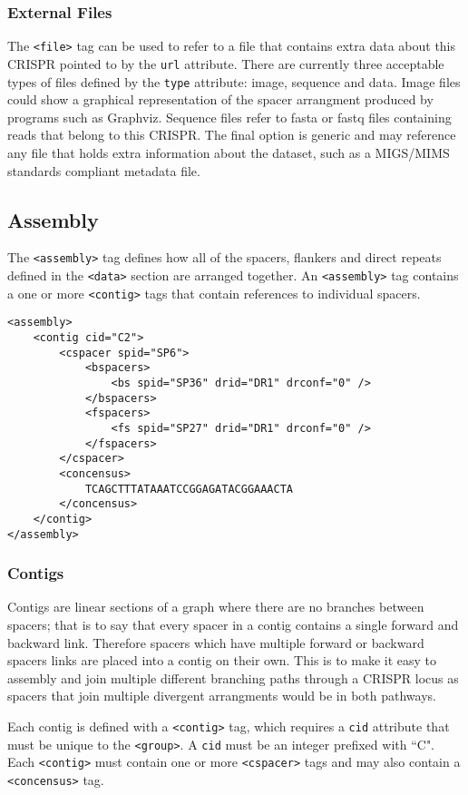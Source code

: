 \documentclass[11pt]{article} %
\begin{document}
\subsubsection{External Files}
The \lstinline[language=XML_new]$<file>$ tag can be used to refer to a file that contains extra data about this CRISPR pointed to by the \lstinline[language=XML_new]$url$ attribute.  There are currently three acceptable types of files defined by the \lstinline[language=XML_new]$type$ attribute: image, sequence and data.  Image files could show a graphical representation of the spacer arrangment produced by programs such as Graphviz.  Sequence files refer to fasta or fastq files containing reads that belong to this CRISPR. The final option is generic and may reference any file that holds extra information about the dataset, such as a MIGS/MIMS standards compliant metadata file. 
\subsection{Assembly}
The \lstinline[language=XML_new]$<assembly>$ tag defines how all of the spacers, flankers and direct repeats defined in the \lstinline[language=XML_new]$<data>$ section are arranged together.  An \lstinline[language=XML_new]$<assembly>$ tag contains a one or more \lstinline[language=XML_new]$<contig>$ tags that contain references to individual spacers.  
\begin{lstlisting}[language=XML_new]
<assembly>
	<contig cid="C2">
		<cspacer spid="SP6">
			<bspacers>
				<bs spid="SP36" drid="DR1" drconf="0" />
			</bspacers>
			<fspacers>
				<fs spid="SP27" drid="DR1" drconf="0" />
			</fspacers>
		</cspacer>
		<concensus>
			TCAGCTTTATAAATCCGGAGATACGGAAACTA
		</concensus>
	</contig>
</assembly>
\end{lstlisting}
\subsubsection{Contigs}
Contigs are linear sections of a graph where there are no branches between spacers; that is to say that every spacer in a contig contains a single forward and backward link.  Therefore spacers which have multiple forward or backward spacers links are placed into a contig on their own.  This is to make it easy to assembly and join multiple different branching paths through a CRISPR locus as spacers that join multiple divergent arrangments would be in both pathways.

Each contig is defined with a \lstinline[language=XML_new]$<contig>$ tag, which requires a  \lstinline[language=XML_new]$cid$ attribute that must be unique to the \lstinline[language=XML_new]$<group>$.  A \lstinline[language=XML_new]$cid$ must be an integer prefixed with ``C".  Each \lstinline[language=XML_new]$<contig>$ must contain one or more \lstinline[language=XML_new]$<cspacer>$ tags and may also contain a \lstinline[language=XML_new]$<concensus>$ tag.
\end{document}
